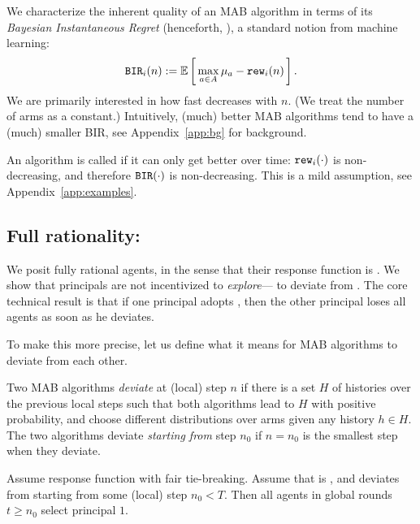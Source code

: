 We characterize the inherent quality of an MAB algorithm in terms of its \emph{Bayesian Instantaneous Regret} (henceforth, \BIR), a standard notion from machine learning:
\begin{align}\label{eq:theory-BIR-defn}
\BIR_i(n) := \E\sbr{ \max_{a\in A} \mu_a - \rew_i(n)}.
\end{align}
We are primarily interested in how fast \BIR decreases with $n$. (We treat the number of arms as a constant.) Intuitively, (much) better MAB algorithms tend to have a (much) smaller BIR, see Appendix~\ref{app:bg} for background.

An algorithm is called \emph{\bmonotone} if it can only get better over time: $\mathtt{rew}_i(\cdot)$ is non-decreasing, and therefore $\mathtt{BIR}(\cdot)$ is non-decreasing. This is a mild assumption, see
Appendix~\ref{app:examples}.



\subsection{Full rationality: \HardMax}
\label{sec:theory-HM}

We posit fully rational agents, in the sense that their response function is \HardMax. We show that principals are not incentivized to \emph{explore}--- \ie to deviate from \DynGreedy. The core technical result is that if one principal adopts \DynGreedy, then the other principal loses all agents as soon as he deviates.

To make this more precise, let us define what it means for MAB algorithms to deviate from each other.

\begin{definition}
Two MAB algorithms \emph{deviate} at (local) step $n$ if there is a set $H$ of histories over the previous local steps such that both algorithms lead to $H$ with positive probability, and choose different distributions over arms given any history $h\in H$. The two algorithms deviate \emph{starting from} step $n_0$ if $n=n_0$ is the smallest step when they deviate.
\end{definition}

\begin{theorem}\label{thm:DG-dominance}
Assume \HardMax response function with fair tie-breaking. Assume that \alg[1] is \DynGreedy, and \alg[2] deviates from \DynGreedy starting from some (local) step $n_0<T$. Then all agents in global rounds $t\geq n_0$ select principal $1$.
\end{theorem}


